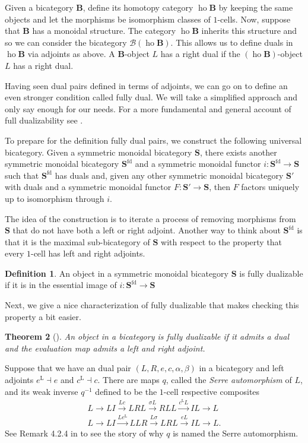 \documentclass[11pt]{amsart}
\newcommand{\op}[1]{\operatorname{#1}}
\newcommand{\cat}[1]{\mathbf{#1}}
\newcommand{\from}{\colon}
\newcommand{\xto}[1]{\xrightarrow{#1}}
\newtheorem{thm}{Theorem}[section]
\theoremstyle{remark}
\theoremstyle{definition}
\newtheorem{defn}[thm]{Definition}
\begin{document}
Given a bicategory $\cat{B}$, define its homotopy category $\op{ho} \cat{B}$ by keeping the same objects and let the morphisms be isomorphism classes of $1$-cells. Now, suppose that $\cat{B}$ has a monoidal structure. The category $\op{ho} \cat{B}$ inherits this structure and so we can consider the bicategory $\mathcal{B} (\op{ho} \cat{B})$. This allows us to define duals in $\op{ho}\cat{B}$ via adjoints as above. A $\cat{B}$-object $L$ has a right dual if the $(\op{ho} \cat{B})$-object $L$ has a right dual.

Having seen dual pairs defined in terms of adjoints, we can go on to define an even stronger condition called fully dual.  We will take a simplified approach and only say enough for our needs. For a more fundamental and general account of full dualizability see \cite{Lurie,Piotr}. 

To prepare for the definition fully dual pairs, we construct the following universal bicategory. Given a symmetric monoidal bicategory $\cat{S}$, there exists another symmetric monoidal bicategory $\cat{S}^{\text{fd}}$ and a symmetric monoidal functor $i \from \cat{S}^{\text{fd}} \to \cat{S}$ such that $\cat{S}^{\text{fd}}$ has duals and, given any other symmetric monoidal bicategory $\cat{S}'$ with duals and a symmetric monoidal functor $F \from \cat{S}' \to \cat{S}$, then $F$ factors uniquely up to isomorphism through $i$. 

The idea of the construction is to iterate a process of removing morphisms from $\cat{S}$ that do not have both a left or right adjoint. Another way to think about $\cat{S}^{\text{fd}}$ is that it is the maximal sub-bicategory of $\cat{S}$ with respect to the property that every $1$-cell has left and right adjoints.  

\begin{defn}
\label{def:FullDual}
	An object in a symmetric monoidal bicategory $\cat{S}$ is fully dualizable if it is in the essential image of $i \from \cat{S}^{\text{fd}} \to \cat{S}$
\end{defn}  

Next, we give a nice characterization of fully dualizable that makes checking this property a bit easier.

\begin{thm}[{\cite[Prop.~4.2.3]{Lurie}}]
	An object in a bicategory is fully dualizable if it admits a dual and the evaluation map admits a left and right adjoint.  
\end{thm}

Suppose that we have an dual pair $(L,R,e,c,\alpha,\beta)$ in a bicategory and left adjoints $e^\text{L} \dashv e$ and $c^\text{L} \dashv c$.  There are maps $q$, called the \emph{Serre automorphism} of $L$, and its weak inverse $q^{-1}$ defined to be the $1$-cell respective composites
\begin{align*}
	L \to LI 
	\xto{Lc} LRL 
	\xto{\sigma L} RLL 
	\xto{c^\text{L}L} IL
	\to L \\
	L \to LI
	\xto{Le^\text{L}} LLR
	\xto{L\sigma} LRL
	\xto{eL} IL
	\to L.
\end{align*}
See Remark 4.2.4 in \cite{Lurie} to see the story of why $q$ is named the Serre automorphism.  
\end{document}
